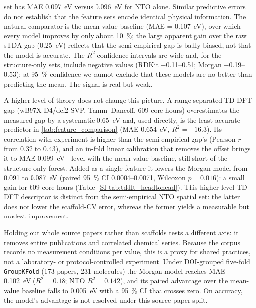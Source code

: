 set has MAE \qty{0.097}{\electronvolt} versus
\qty{0.096}{\electronvolt} for NTO alone. Similar predictive errors do not
establish that the feature sets encode identical physical information.
The natural comparator is the mean-value baseline (MAE = \qty{0.107}{\electronvolt}),
over which every model improves by only about \qty{10}{\percent}; the large apparent
gain over the raw sTDA gap (\qty{0.25}{\electronvolt}) reflects that the semi-empirical
gap is badly biased, not that the model is accurate.
The $R^2$ confidence intervals are wide and, for the structure-only sets, include
negative values (RDKit \numrange{-0.11}{0.51}; Morgan \numrange{-0.19}{0.53}): at
\qty{95}{\percent} confidence we cannot exclude that these models are no better than
predicting the mean. The signal is real but weak.

A higher level of theory does not change this picture. A range-separated TD-DFT
gap (wB97X-D4/def2-SVP, Tamm--Dancoff, \num{609} core-hours) overestimates the
measured gap by a systematic \qty{0.65}{\electronvolt} and, used directly, is the
least accurate predictor in \cref{tab:feature_comparison} (MAE
\qty{0.654}{\electronvolt}, $R^2 = -16.3$). Its correlation with experiment is
higher than the semi-empirical gap's (Pearson $r$ from \num{0.32} to \num{0.43}),
and an in-fold linear calibration that removes the offset brings it to MAE
\qty{0.099}{\electronvolt}---level with the mean-value baseline, still short of
the structure-only forest. Added as a single feature it lowers the Morgan model
from \num{0.091} to \qty{0.087}{\electronvolt} (paired \qty{95}{\percent} CI
\numrange{0.0004}{0.0071}, Wilcoxon $p = 0.016$): a small gain for
\num{609} core-hours (Table~\ref{SI-tab:tddft_headtohead}). This higher-level
TD-DFT descriptor is distinct from the semi-empirical NTO spatial set: the
latter does not lower the scaffold-CV error, whereas the former yields a
measurable but modest improvement.

Holding out whole source papers rather than scaffolds tests a different axis:
it removes entire publications and correlated chemical series. Because the corpus
records no measurement conditions per value, this is a proxy for shared practices,
not a laboratory- or protocol-controlled experiment. Under DOI-grouped five-fold
\texttt{GroupKFold} (\num{173} papers, \num{231} molecules) the Morgan model reaches
MAE \qty{0.102}{\electronvolt} ($R^2 = 0.18$; NTO $R^2 = 0.142$), and its paired advantage over the
mean-value baseline falls to \qty{0.005}{\electronvolt} with a \qty{95}{\percent}
CI that crosses zero. On accuracy, the model's advantage is not resolved under
this source-paper split.

